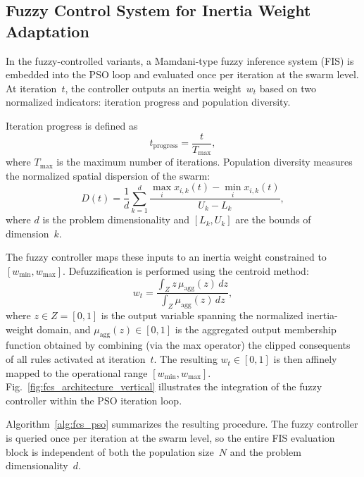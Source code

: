 \documentclass[conference]{IEEEtran}
\newcommand{\new}[1]{{\color{red}#1}}
\begin{document}
\subsection{Fuzzy Control System for Inertia Weight Adaptation}
\label{subsec:fcs}

In the fuzzy-controlled variants, a Mamdani-type fuzzy inference system (FIS) is embedded into the PSO loop and evaluated once per iteration at the swarm level. At iteration~$t$, the controller outputs an inertia weight~$w_t$ based on two normalized indicators: iteration progress and population diversity.

Iteration progress is defined as
\begin{equation}
    t_{\text{progress}} = \frac{t}{T_{\max}},
    \label{eq:iteration_progress}
\end{equation}
where $T_{\max}$ is the maximum number of iterations. Population diversity measures the normalized spatial dispersion of the swarm:
\begin{equation}
    D(t) = \frac{1}{d} \sum_{k=1}^{d}
    \frac{\max_i x_{i,k}(t) - \min_i x_{i,k}(t)}{U_k - L_k},
    \label{eq:diversity_metric}
\end{equation}
where $d$ is the problem dimensionality and $[L_k, U_k]$ are the bounds of dimension~$k$.

The fuzzy controller maps these inputs to an inertia weight constrained to $[w_{\min}, w_{\max}]$. Defuzzification is performed using the centroid method:
\begin{equation}
    w_t = \frac{\int_{Z} z \, \mu_{\text{agg}}(z)\, dz}{\int_{Z} \mu_{\text{agg}}(z)\, dz},
    \label{eq:defuzzification}
\end{equation}
\new{where $z \in Z = [0, 1]$ is the output variable spanning the normalized inertia-weight domain, and $\mu_{\text{agg}}(z) \in [0, 1]$ is the aggregated output membership function obtained by combining (via the max operator) the clipped consequents of all rules activated at iteration~$t$. The resulting $w_t \in [0,1]$ is then affinely mapped to the operational range $[w_{\min}, w_{\max}]$.} Fig.~\ref{fig:fcs_architecture_vertical} illustrates the integration of the fuzzy controller within the PSO iteration loop.




\new{Algorithm~\ref{alg:fcs_pso} summarizes the resulting procedure. The fuzzy controller is queried once per iteration at the swarm level, so the entire FIS evaluation block is independent of both the population size~$N$ and the problem dimensionality~$d$.}
\end{document}

